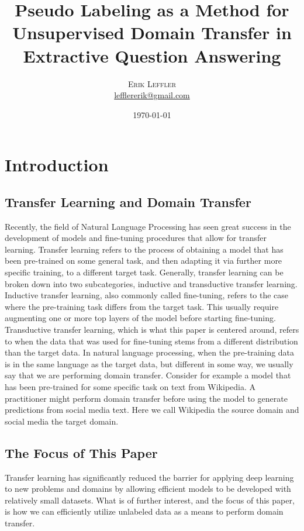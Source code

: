 \documentclass[twoside,twocolumn]{article}
\title{Pseudo Labeling as a Method for Unsupervised Domain Transfer in Extractive Question Answering} %
\author{%
\textsc{Erik Leffler} \\[1ex] %
\normalsize \href{mailto:lefflererik@gmail.com}{lefflererik@gmail.com} %
}
\date{\today} %
\begin{document}
\maketitle


\section{Introduction}
\subsection{Transfer Learning and Domain Transfer}
Recently, the field of Natural Language Processing has seen great success in the
development of models and fine-tuning procedures that allow for transfer
learning. Transfer learning refers to the process of obtaining a model that has
been pre-trained on some general task, and then adapting it via further more
specific training, to a different target task. Generally, transfer learning can be broken
down into two subcategories, inductive and transductive transfer learning.
Inductive transfer learning, also commonly called fine-tuning, refers to the
case where the pre-training task differs from the target task. This usually
require augmenting one or more top layers of the model before starting
fine-tuning. Transductive transfer learning, which is what this paper is 
centered around, refers to when the data that was used for fine-tuning stems
from a different distribution than the target data. In natural language
processing, when the pre-training data is in the same language as the target
data, but different in some way, we usually say that we are
performing domain transfer. Consider for example a model that has been
pre-trained for some specific task on text from Wikipedia. A practitioner might
perform domain transfer before using the model to generate predictions from
social media text. Here we call Wikipedia the source domain and social media 
the target domain.

\subsection{The Focus of This Paper}

Transfer learning has significantly reduced the barrier for applying deep
learning to new problems and domains by allowing efficient models to be
developed with relatively small datasets. What is of further interest, and the
focus of this paper, is how we can efficiently utilize unlabeled data as a means
to perform domain transfer. \\
\end{document}
